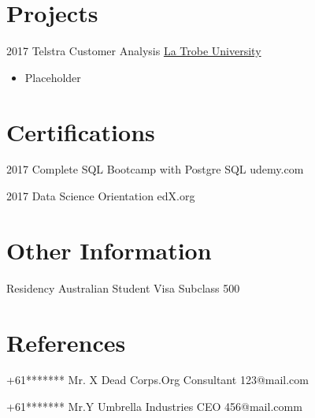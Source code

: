 \documentclass[letterpaper]{twentysecondcv} %
\begin{document}
\section{Projects}
\begin{twenty}
	\twentyitem
    	{2017}
        {Telstra Customer Analysis}
        {\href{http://www.uoguelph.ca/}{La Trobe University}}
        {}
        {
        {\begin{itemize}
        \item Placeholder
       
    \end{itemize}}
        }
\end{twenty}


\section{Certifications}
\begin{twenty} %
	\twentyitem
    	{2017}
        {Complete SQL Bootcamp with Postgre SQL}
        {udemy.com}
        {}
        {}
        
	\twentyitem
    	{2017}
        {Data Science Orientation}
        {edX.org}
        {}
        {}
        
        
\end{twenty}

\section{Other Information}
\begin{twenty} %
	\twentyitem
    	{Residency}
        {Australian Student Visa}
        {Subclass 500}
        {}
        {}
        
\end{twenty}

\section{References}
\begin{twenty} %
	\twentyitem
    	{+61*******}
        {Mr. X}
        {Dead Corps.Org}
        {Consultant}
        {123@mail.com}
        
	\twentyitem
    	{+61*******}
        {Mr.Y}
        {Umbrella Industries}
        {CEO}
        {456@mail.comm}
        
\end{twenty}
\end{document}
